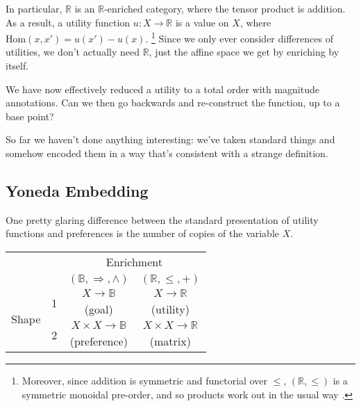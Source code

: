 \documentclass{article}
\begin{document}
	\begin{example}
		In particular, $\mathbb R$ is an $\mathbb R$-enriched category, where the tensor product is addition. As a result, a utility function $u: X \to \mathbb R$ is a value on $X$, where $\mathrm{Hom}(x, x') = u(x') - u(x)$. \footnote{Moreover, since addition is symmetric and functorial over $\leq$, $(\mathbb R, \leq)$ is a symmetric monoidal pre-order, and so products work out in the usual way \cite{spivek-ex2.74}.} Since we only ever consider differences of utilities, we don't actually need $\mathbb R$, just the affine space we get by enriching by itself. 
	\end{example} 

	We have now effectively reduced a utility to a total order with magnitude annotations. Can we then go backwards and re-construct the function, up to a base point?
	
	
	So far we haven't done anything interesting: we've taken standard things and somehow encoded them in a way that's consistent with a strange definition.
	
	
	
	\subsection{Yoneda Embedding}
	One pretty glaring difference between the standard presentation of utility functions and preferences is the number of copies of the variable $X$.
	\begin{center}
		\renewcommand{\arraystretch}{1.4}
		\begin{tabular}{cr cc}
			&& \multicolumn{2}{c}{Enrichment} \\
			&& $(\mathbb B, \Rightarrow, \land)$ & $(\mathbb R,\leq,+)$ \\\cline{3-4}
		\multirow{4}{*}{Shape}&\multirow{2}{*}{1} & \multicolumn{1}{|c|}{$X \to \mathbb B$} & \multicolumn{1}{c|}{$X \to \mathbb R$} \\
			&	& \multicolumn{1}{|c|}{(goal)}  & \multicolumn{1}{c|}{(utility)} \\\cline{3-4}
			& \multirow{2}{*}{2} & \multicolumn{1}{|c|}{$X\times X \to \mathbb B$} & \multicolumn{1}{c|}{$X \times X \to \mathbb R$} \\
			&	& \multicolumn{1}{|c|}{(preference)} & \multicolumn{1}{c|}{(matrix)} \\\cline{3-4}
		\end{tabular}
	\end{center}
	\vspace{1em}
\end{document}
